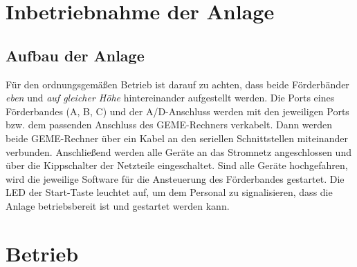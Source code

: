 \documentclass[oneside,a4paper,titlepage]{scrartcl} %
\begin{document}
\section{Inbetriebnahme der Anlage}
\subsection{Aufbau der Anlage}
Für den ordnungsgemäßen Betrieb ist darauf zu achten, dass beide Förderbänder \emph{eben} und \emph{auf gleicher Höhe} hintereinander aufgestellt werden.\newline
\newline
Die Ports eines Förderbandes (A, B, C) und der A/D-Anschluss werden mit den jeweiligen Ports bzw. dem passenden Anschluss des GEME-Rechners verkabelt.\newline
\newline
Dann werden beide GEME-Rechner über ein Kabel an den seriellen Schnittstellen miteinander verbunden.\newline
\newline
Anschließend werden alle Geräte an das Stromnetz angeschlossen und über die Kippschalter der Netzteile eingeschaltet.\newline
\newline
Sind alle Geräte hochgefahren, wird die jeweilige Software für die Ansteuerung des Förderbandes gestartet.\newline
\newline
Die LED der Start-Taste leuchtet auf, um dem Personal zu signalisieren, dass die Anlage betriebsbereit ist und gestartet werden kann.

\newpage

\section{Betrieb}
\end{document}
